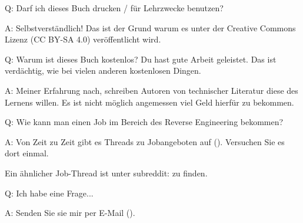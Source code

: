 \par Q: Darf ich dieses Buch drucken / für Lehrzwecke benutzen?
\par A: Selbstverständlich! Das ist der Grund warum es unter der Creative Commons Lizenz (CC BY-SA 4.0) veröffentlicht wird.

\par Q: Warum ist dieses Buch kostenlos? Du hast gute Arbeit geleistet. Das ist verdächtig, wie bei vielen anderen kostenlosen Dingen.
\par A: Meiner Erfahrung nach, schreiben Autoren von technischer Literatur diese des Lernens willen. Es ist nicht möglich angemessen
viel Geld hierfür zu bekommen.

\par Q: Wie kann man einen Job im Bereich des Reverse Engineering bekommen?
\par A: Von Zeit zu Zeit gibt es Threads zu Jobangeboten auf \FNURLREDDIT{}
(\RedditHiringThread{}).
Versuchen Sie es dort einmal.

Ein ähnlicher Job-Thread ist unter subreddit: \NetsecHiringThread{} zu finden.

\par Q: Ich habe eine Frage...
\par A: Senden Sie sie mir per E-Mail (\EMAIL).
